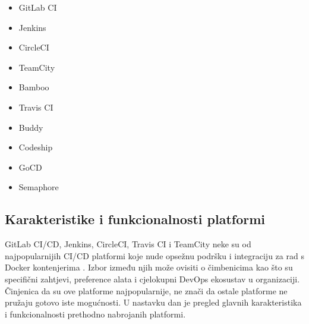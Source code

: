 \documentclass[a4paper,12pt,oneside]{article}
\begin{document}
\begin{multicols}{2}
\begin{itemize}
\item GitLab CI
\item Jenkins
\item CircleCI
\item TeamCity
\item Bamboo
\item Travis CI
\item Buddy
\item Codeship
\item GoCD
\item Semaphore
\end{itemize}
\end{multicols}



\subsection{Karakteristike i funkcionalnosti platformi}
GitLab CI/CD, Jenkins, CircleCI, Travis CI i TeamCity neke su od najpopularnijih CI/CD platformi koje nude opsežnu podršku i integraciju za rad s Docker kontenjerima \cite{katalon_ci_tools, atlassian_ci_tools, top_7_ci_tools}. Izbor između njih može ovisiti o čimbenicima kao što su specifični zahtjevi, preference alata i cjelokupni DevOps ekosustav u organizaciji. Činjenica da su ove platforme najpopularnije, ne znači da ostale platforme ne pružaju gotovo iste mogućnosti. U nastavku dan je pregled glavnih karakteristika i funkcionalnosti prethodno nabrojanih platformi.
\end{document}
